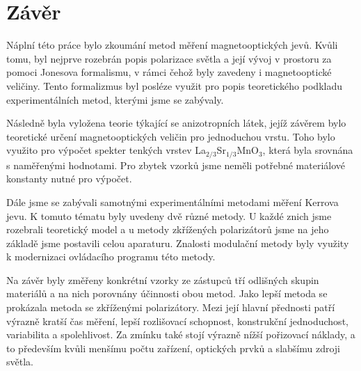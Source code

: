 \chapter*{Závěr}

Náplní této práce bylo zkoumání metod měření magnetooptických jevů. Kvůli tomu, byl nejprve rozebrán popis polarizace světla 
a její vývoj v prostoru za pomoci Jonesova formalismu, v rámci čehož byly zavedeny i magnetooptické veličiny. Tento formalizmus 
byl posléze využit pro popis teoretického podkladu experimentálních metod, kterými jsme se zabývaly.

Následně byla vyložena teorie týkající se anizotropních látek, jejíž závěrem bylo teoretické určení magnetooptických veličin pro jednoduchou 
vrstu. Toho bylo využito pro výpočet spekter tenkých vrstev La$_{2/3}$Sr$_{1/3}$MnO$_3$, která byla srovnána s naměřenými hodnotami. 
Pro zbytek vzorků jsme neměli potřebné materiálové konstanty nutné pro výpočet.

Dále jsme se zabývali samotnými experimentálními metodami měření Kerrova jevu. K tomuto tématu byly uvedeny dvě různé metody. U každé znich 
jsme rozebrali teoretický model a u metody zkřížených polarizátorů jsme na jeho základě jsme postavili celou aparaturu. 
Znalosti modulační metody byly využity k modernizaci ovládacího programu této metody.

Na závěr byly změřeny konkrétní vzorky ze zástupců tří odlišných skupin materiálů a na nich porovnány účinnosti obou metod. Jako lepší metoda
se prokázala metoda se zkříženými polarizátory. Mezi její hlavní přednosti patří výrazně kratší čas měření, lepší rozlišovací schopnost, 
konstrukční jednoduchost, variabilita a spolehlivost. Za zmínku také stojí výrazně nížší pořizovací náklady, a to především kvůli menšímu počtu 
zařízení, optických prvků a slabšímu zdroji světla.
